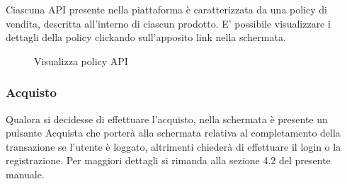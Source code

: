 Ciascuna API presente nella piattaforma è caratterizzata da una policy di vendita, descritta all'interno di ciascun prodotto. E' possibile visualizzare i dettagli della policy clickando sull'apposito link nella schermata.

\label{Visualizza policy API}
\begin{figure}[H]
	\centering
	\caption{Visualizza policy API}
\end{figure}

\subsubsection{Acquisto}
Qualora si decidesse di effettuare l'acquisto, nella schermata è presente un pulsante Acquista che porterà alla schermata relativa al completamento della transazione se l'utente è loggato, altrimenti chiederà di effettuare il login o la registrazione. Per maggiori dettagli si rimanda alla sezione 4.2 del presente manuale.




